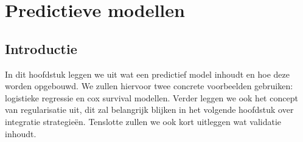 \chapter{Predictieve modellen}
\label{cha:D:predictieve-modellen}

\section{Introductie}
\label{sec:D:pm-introductie}
In dit hoofdstuk leggen we uit wat een predictief model inhoudt en hoe deze worden opgebouwd. We zullen hiervoor twee concrete voorbeelden gebruiken: logistieke regressie en cox survival modellen. Verder leggen we ook het concept van regularisatie uit, dit zal belangrijk blijken in het volgende hoofdstuk over integratie strategie\"en. Tenslotte zullen we ook kort uitleggen wat validatie inhoudt.

